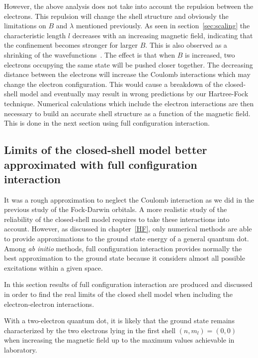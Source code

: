 However, the above analysis does not take into account the repulsion between the electrons. This repulsion will change the shell structure and obviously the limitations on $B$ and $\lambda$ mentioned previously. As seen in section~\ref{sec:scaling} the characteristic length $l$ decreases with an increasing magnetic field, indicating that the confinement becomes stronger for larger $B$. This is also observed as a shrinking of the wavefunctions~\cite{fewElectronQDExperiment}. The effect is that when $B$ is increased, two electrons occupying the same state will be pushed closer together. The decreasing distance between the electrons will increase the Coulomb interactions which may change the electron configuration.  This would cause a breakdown of the closed-shell model and eventually may result in wrong 
predictions by our Hartree-Fock technique.
Numerical calculations which include the electron interactions are then necessary to build an accurate shell structure as a function of the magnetic field. This is done in the next section using full configuration interaction.

\subsection{Limits of the closed-shell model better approximated with full configuration interaction}
\label{sec:breakingModel}

It was a rough approximation to neglect the Coulomb interaction as we did in the previous study of the Fock-Darwin orbitals.
A more realistic study of the reliability of the closed-shell model requires to take these interactions into account. However, as discussed in chapter~\ref{HF}, only numerical methods are able to provide approximations to the ground state energy of a general quantum dot. Among \textit{ab initio} methods, full configuration interaction provides normally the best approximation to the ground state because it considers almost all possible excitations within a given space.

In this section results of full configuration interaction are produced and discussed in order to find the real limits of the closed shell model when including the electron-electron interactions.

With a two-electron quantum dot, it is likely that the ground state remains characterized by the two electrons lying in the first shell $(n,m_l)=(0,0)$ when increasing the magnetic field up to the maximum values achievable in laboratory.

